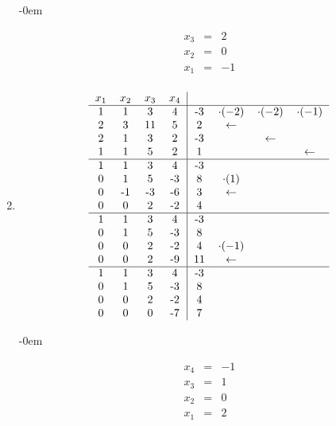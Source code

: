 \begin{enumerate}
					\abovedisplayskip-0em
					
					\[	
						\begin{array} {ccc}
							x_3 & = & 2\\
							x_2 & = & 0\\
							x_1 & = & -1\\
						\end{array}
					\]
				
				\item
						
					\[
						\begin{tabular} {cccc|cccc}
							$x_1$ & $x_2$ & $x_3$ & $x_4$ & & & & \\
							\hline
							1 & 1 & 3 & 4 & -3 & $\cdot(-2)$ & $\cdot(-2)$ & $\cdot(-1)$ \\
							2 & 3 & 11 & 5 & 2 & $\leftarrow$ & & \\
							2 & 1 & 3 & 2 & -3 & & $\leftarrow$ & \\
							1 & 1 & 5 & 2 & 1 & & & $\leftarrow$ \\
							\hline
							1 & 1 & 3 & 4 & -3 & & & \\
							0 & 1 & 5 & -3 & 8 & $\cdot(1)$ & & \\
							0 & -1 & -3 & -6 & 3 & $\leftarrow$ & & \\
							0 & 0 & 2 & -2 & 4 & & & \\
							\hline
							1 & 1 & 3 & 4 & -3 & & & \\
							0 & 1 & 5 & -3 & 8 & & & \\
							0 & 0 & 2 & -2 & 4 & $\cdot(-1)$ & & \\
							0 & 0 & 2 & -9 & 11 & $\leftarrow$ & & \\
							\hline
							1 & 1 & 3 & 4 & -3 & & & \\
							0 & 1 & 5 & -3 & 8 & & & \\
							0 & 0 & 2 & -2 & 4 & & & \\
							0 & 0 & 0 & -7 & 7 & & & \\
						\end{tabular}
					\]
					
					\abovedisplayskip-0em
					
					\[
						\begin{array} {ccc}
							x_4 & = & -1\\
							x_3 & = & 1\\
							x_2 & = & 0\\
							x_1 & = & 2\\
						\end{array}
					\]	
							

\end{enumerate}
